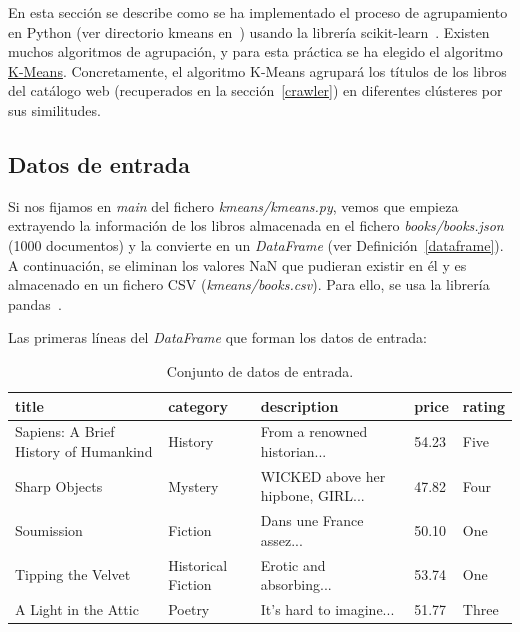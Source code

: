 \documentclass{uimppracticas}
\begin{document}
En esta sección se describe como se ha implementado el proceso de agrupamiento en Python (ver directorio kmeans en~\cite{GitHubRepo}) usando la librería scikit-learn~\cite{scikit-learn}. Existen muchos algoritmos de agrupación, y para esta práctica se ha elegido el algoritmo \href{https://scikit-learn.org/stable/modules/generated/sklearn.cluster.KMeans.html}{K-Means}. Concretamente, el algoritmo K-Means agrupará los títulos de los libros del catálogo web (recuperados en la sección~\ref{crawler}) en diferentes clústeres por sus similitudes.

\subsection{Datos de entrada}

Si nos fijamos en \textit{main} del fichero \textit{kmeans/kmeans.py}, vemos que empieza extrayendo la información de los libros almacenada en el fichero \textit{books/books.json} (1000 documentos) y la convierte en un \textit{DataFrame} (ver Definición~\ref{dataframe}). A continuación, se eliminan los valores NaN que pudieran existir en él y es almacenado en un fichero CSV (\textit{kmeans/books.csv}). Para ello, se usa la librería pandas~\cite{jeff_reback_2020_4309786}.

Las primeras líneas del \textit{DataFrame} que forman los datos de entrada:

\begin{table}[h]
	\begin{adjustbox}{width=\columnwidth,center}
		\begin{tabular}{lllll}
			\toprule
			title & category & description & price & rating \\
			\midrule
			Sapiens: A Brief History of Humankind & History & From a renowned historian... & 54.23 & Five \\
			Sharp Objects & Mystery & WICKED above her hipbone, GIRL... & 47.82 & Four \\
			Soumission & Fiction & Dans une France assez... & 50.10 & One \\
			Tipping the Velvet & Historical Fiction & Erotic and absorbing... & 53.74 & One \\
			A Light in the Attic & Poetry & It's hard to imagine... & 51.77 & Three \\
			\bottomrule
		\end{tabular}
	\end{adjustbox}
	\caption{Conjunto de datos de entrada.}
	\label{table1}
\end{table}
\end{document}
